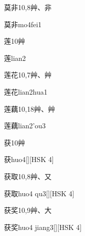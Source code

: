 \begin{Entry}{莫非}{10,8}{⾋、⾮}
  \begin{Phonetics}{莫非}{mo4fei1}
  \end{Phonetics}
\end{Entry}

\begin{Entry}{莲}{10}{⾋}
  \begin{Phonetics}{莲}{lian2}
  \end{Phonetics}
\end{Entry}

\begin{Entry}{莲花}{10,7}{⾋、⾋}
  \begin{Phonetics}{莲花}{lian2hua1}
  \end{Phonetics}
\end{Entry}

\begin{Entry}{莲藕}{10,18}{⾋、⾋}
  \begin{Phonetics}{莲藕}{lian2'ou3}
  \end{Phonetics}
\end{Entry}

\begin{Entry}{获}{10}{⾋}
  \begin{Phonetics}{获}{huo4}[][HSK 4]
  \end{Phonetics}
\end{Entry}

\begin{Entry}{获取}{10,8}{⾋、⼜}
  \begin{Phonetics}{获取}{huo4 qu3}[][HSK 4]
  \end{Phonetics}
\end{Entry}

\begin{Entry}{获奖}{10,9}{⾋、⼤}
  \begin{Phonetics}{获奖}{huo4 jiang3}[][HSK 4]
  \end{Phonetics}
\end{Entry}

